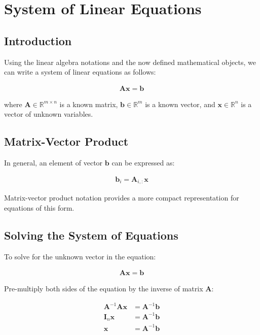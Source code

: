 \chapter{System of Linear Equations}

\para

\section{Introduction}

Using the linear algebra notations and the now defined mathematical objects, we can write a system of linear equations as follows:

\begin{align}
\mathbf{A}\mathbf{x} = \mathbf{b}
\end{align}

where \(\mathbf{A} \in \mathbb{R}^{m \times n}\) is a known matrix, \(\mathbf{b} \in \mathbb{R}^{m}\) is a known vector, and \(\mathbf{x} \in \mathbb{R}^{n}\) is a vector of unknown variables.

\para

\section{Matrix-Vector Product}

In general, an element of vector \(\mathbf{b}\) can be expressed as:

\begin{align}
\mathbf{b}_{i} = \mathbf{A}_{i,:}\mathbf{x}
\end{align}

Matrix-vector product notation provides a more compact representation for equations of this form.

\clearpage
\newpage

\section{Solving the System of Equations}

To solve for the unknown vector in the equation:

\begin{align}
\mathbf{A}\mathbf{x} = \mathbf{b}
\end{align}

\para

Pre-multiply both sides of the equation by the inverse of matrix \(\mathbf{A}\):

\begin{align}
\mathbf{A}^{-1}\mathbf{A}\mathbf{x} &= \mathbf{A}^{-1}\mathbf{b} \\
\mathbf{I}_{n}\mathbf{x} &= \mathbf{A}^{-1}\mathbf{b} \\
\mathbf{x} &= \mathbf{A}^{-1}\mathbf{b}
\end{align}


